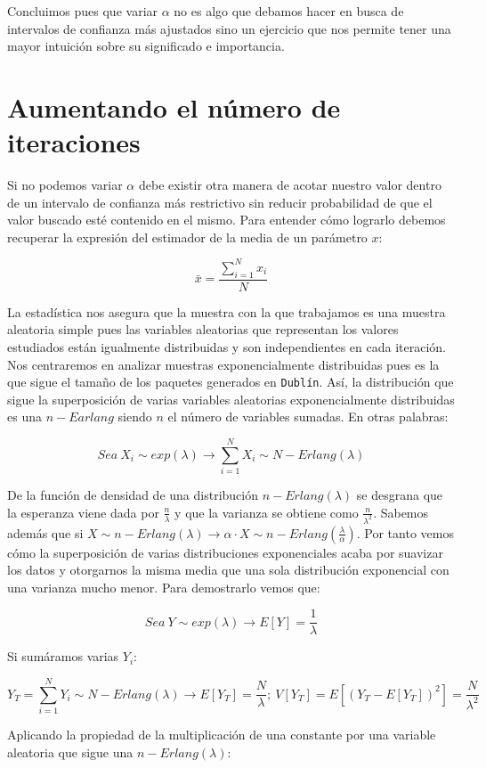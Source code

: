 \documentclass{article}[10pt]
\begin{document}
		Concluimos pues que variar $\alpha$ no es algo que debamos hacer en busca de intervalos de confianza más ajustados sino un ejercicio que nos permite tener una mayor intuición sobre su significado e importancia.

	\section{Aumentando el número de iteraciones}
		Si no podemos variar $\alpha$ debe existir otra manera de acotar nuestro valor dentro de un intervalo de confianza más restrictivo sin reducir probabilidad de que el valor buscado esté contenido en el mismo. Para entender cómo lograrlo debemos recuperar la expresión del estimador de la media de un parámetro $x$:

		$$\bar{x} = \frac{\sum_{i = 1}^N x_i}{N}$$

		La estadística nos asegura que la muestra con la que trabajamos es una muestra aleatoria simple pues las variables aleatorias que representan los valores estudiados están igualmente distribuidas y son independientes en cada iteración. Nos centraremos en analizar muestras exponencialmente distribuidas pues es la que sigue el tamaño de los paquetes generados en \texttt{Dublín}. Así, la distribución que sigue la superposición de varias variables aleatorias exponencialmente distribuidas es una $n-Earlang$ siendo $n$ el número de variables sumadas. En otras palabras:

		$$Sea\ X_i \sim exp(\lambda) \rightarrow \sum_{i = 1}^N X_i \sim N-Erlang(\lambda)$$

		De la función de densidad de una distribución $n-Erlang(\lambda)$ se desgrana que la esperanza viene dada por $\frac{n}{\lambda}$ y que la varianza se obtiene como $\frac{n}{\lambda^2}$. Sabemos además que si $X \sim n-Erlang(\lambda) \rightarrow \alpha \cdot X \sim n-Erlang(\frac{\lambda}{\alpha})$. Por tanto vemos cómo la superposición de varias distribuciones exponenciales acaba por suavizar los datos y otorgarnos la misma media que una sola distribución exponencial con una varianza mucho menor. Para demostrarlo vemos que:

		$$Sea\ Y \sim exp(\lambda) \rightarrow E[Y] = \frac{1}{\lambda}$$

		Si sumáramos varias $Y_i$:

		$$Y_T = \sum_{i = 1}^N Y_i \sim N-Erlang(\lambda) \rightarrow E[Y_T] = \frac{N}{\lambda};\ V[Y_T] = E[(Y_T - E[Y_T])^2] = \frac{N}{\lambda^2}$$

		Aplicando la propiedad de la multiplicación de una constante por una variable aleatoria que sigue una $n-Erlang(\lambda)$:
\end{document}

